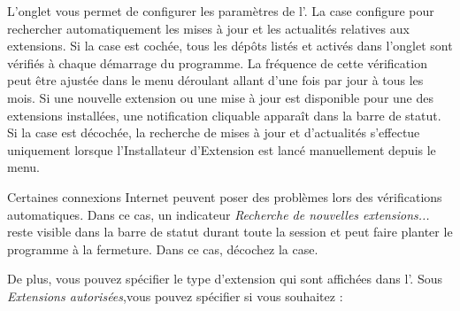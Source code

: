 L'onglet  vous permet de configurer les paramètres de l'. La case  configure \qg pour rechercher automatiquement les mises à jour et les actualités relatives aux extensions. Si la case est cochée, tous les dépôts listés et activés dans l'onglet  sont vérifiés à chaque démarrage du programme. La fréquence de cette vérification peut être ajustée dans le menu déroulant allant d'une fois par jour à tous les mois. Si une nouvelle extension ou une mise à jour est disponible pour une des extensions installées, une notification cliquable apparaît dans la barre de statut. Si la case est décochée, la recherche de mises à jour et d'actualités s'effectue uniquement lorsque l'Installateur d'Extension est lancé manuellement depuis le menu.


Certaines connexions Internet peuvent poser des problèmes lors des vérifications automatiques. Dans ce cas, un indicateur \textit{Recherche de nouvelles extensions...} reste visible dans la barre de statut durant toute la session \qg et peut faire planter le programme à la fermeture. Dans ce cas, décochez la case.

De plus, vous pouvez spécifier le type d'extension qui sont affichées dans l'. Sous \textit{Extensions autorisées},vous pouvez spécifier si vous souhaitez :

